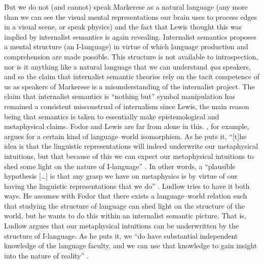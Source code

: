But we do not (and cannot) speak Markerese as a natural language (any more than we can see the visual mental representations our brain uses to process edges in a visual scene, or speak physics) and the fact that Lewis thought this was implied by internalist semantics is again revealing. Internalist semantics proposes a mental structure (an I-language) in virtue of which language production and comprehension are made possible. This structure is not available to introspection, nor is it anything like a natural language that we can understand \textit{qua} speakers, and so the claim that internalist semantic theories rely on the tacit competence of us as speakers of Markerese is a misunderstanding of the internalist project. The claim that internalist semantics is “nothing but” symbol manipulation has remained a consistent misconstrual of internalism since Lewis, the main reason being that semantics is taken to essentially make epistemological and metaphysical claims. Fodor and Lewis are far from alone in this. \citet{Ludlow2003}, for example, argues for a certain kind of language--world isomorphism. As he puts it, “[t]he idea is that the linguistic representations will indeed underwrite our metaphysical intuitions, but that because of this we can expect our metaphysical intuitions to shed some light on the nature of I-language” \citep[154]{Ludlow2003}. In other words, a “plausible hypothesis […] is that any grasp we have on metaphysics is by virtue of our having the linguistic representations that we do” \citep[155]{Ludlow2003}. Ludlow tries to have it both ways. He assumes with Fodor that there exists a language--world relation such that studying the structure of language can shed light on the structure of the world, but he wants to do this within an internalist semantic picture. That is, Ludlow argues that our metaphysical intuitions can be underwritten by the structure of I-language. As he puts it, we “do have substantial independent knowledge of the language faculty, and we can use that knowledge to gain insight into the nature of reality” \citep[154]{Ludlow2003}.

